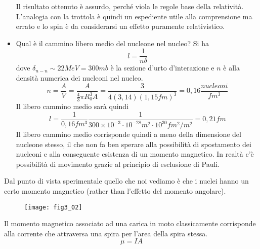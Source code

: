 \begin{itemize}
Il risultato ottenuto è assurdo, perché viola le regole base della relatività. 
L'analogia con la trottola è quindi un espediente utile alla comprensione ma errato e lo spin è da considerarsi un effetto puramente relativistico.
\item Qual è il cammino libero medio del nucleone nel nucleo?
Si ha
\begin{equation}
l=\frac{1}{n\delta}
\end{equation}
dove $\delta_{n-n}\sim 22MeV=300 mb$ è la sezione d'urto d'interazione e $n$ è alla densità numerica dei nucleoni nel nucleo.
\begin{equation}
n=\frac{A}{V}=\frac{A}{\frac{4}{3}\pi R_0^3 A}=\frac{3}{4(3,14)(1,15fm)^3}=0,16\frac{nucleoni}{fm^3}
\end{equation}
Il libero cammino medio sarà quindi
\begin{equation}
l=\frac{1}{0,16fm^3}\frac{1}{300\times 10^{-3}\cdot10^{-28}m^2\cdot 10^{30}fm^2/m^2}=0,21fm
\end{equation}
Il libero cammino medio corrisponde quindi a meno della dimensione del nucleone stesso, il che non fa ben sperare alla possibilità di spostamento dei nucleoni e alla conseguente esistenza di un momento magnetico.
In realtà c'è possibilità di movimento grazie al principio di esclusione di Pauli.
\end{itemize}

Dal punto di vista sperimentale quello che noi vediamo è che i nuclei hanno un certo momento magnetico (rather than l'effetto del momento angolare).
\begin{figure}[h]
\centering
\texttt{[image: fig3\_02]}
\end{figure}
Il momento magnetico associato ad una carica in moto classicamente corrisponde alla corrente che attraversa una spira per l'area della spira stessa.
\begin{equation}
\mu=IA
\end{equation}

